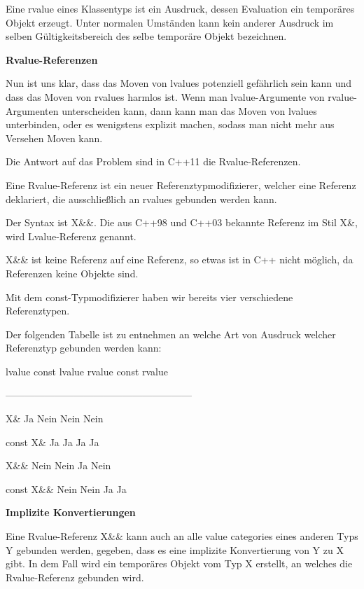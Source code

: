\documentclass{article}
\begin{document}
Eine rvalue eines Klassentyps ist ein Ausdruck, dessen Evaluation ein temporäres 
Objekt erzeugt. Unter normalen Umständen kann kein anderer Ausdruck im selben 
Gültigkeitsbereich des selbe temporäre Objekt bezeichnen.

\vspace{38pt}
\textbf{Rvalue-Referenzen}

Nun ist uns klar, dass das Moven von lvalues potenziell gefährlich sein kann und 
dass das Moven von rvalues harmlos ist. Wenn man lvalue-Argumente von rvalue-Argumenten 
unterscheiden kann, dann kann man das Moven von lvalues unterbinden, oder es wenigstens 
explizit machen, sodass man nicht mehr aus Versehen Moven kann.

Die Antwort auf das Problem sind in C++11 die Rvalue-Referenzen.

Eine Rvalue-Referenz ist ein neuer Referenztypmodifizierer, welcher eine Referenz 
deklariert, die ausschließlich an rvalues gebunden werden kann.

Der Syntax ist X\&\&. Die aus C++98 und C++03 bekannte Referenz im Stil X\&, wird 
Lvalue-Referenz genannt.

X\&\& ist keine Referenz auf eine Referenz, so etwas ist in C++ nicht möglich, 
da Referenzen keine Objekte sind.

Mit dem const-Typmodifizierer haben wir bereits vier verschiedene Referenztypen.

Der folgenden Tabelle ist zu entnehmen an welche Art von Ausdruck welcher Referenztyp 
gebunden werden kann:            

\parindent=43pt
lvalue   const lvalue   rvalue   const rvalue

\parindent=0pt
---------------------------------------------------------              

X\&          Ja     Nein           Nein     Nein

const X\&    Ja        Ja             Ja       Ja

X\&\&         Nein      Nein           Ja       Nein

const X\&\&   Nein      Nein           Ja       Ja

\vspace{12pt}
\textbf{Implizite Konvertierungen}

Eine Rvalue-Referenz X\&\& kann auch an alle value categories eines anderen Typs 
Y gebunden werden, gegeben, dass es eine implizite Konvertierung von Y zu X gibt. 
In dem Fall wird ein temporäres Objekt vom Typ X erstellt, an welches die Rvalue-Referenz 
gebunden wird.
\end{document}
